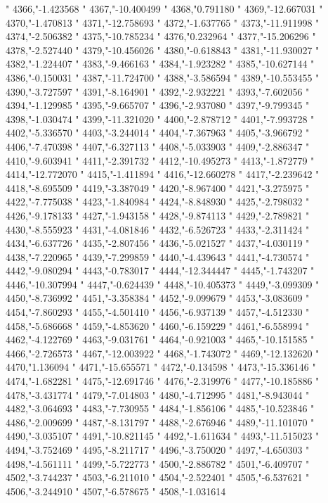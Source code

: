 "
4366,"-1.423568
"
4367,"-10.400499
"
4368,"0.791180
"
4369,"-12.667031
"
4370,"-1.470813
"
4371,"-12.758693
"
4372,"-1.637765
"
4373,"-11.911998
"
4374,"-2.506382
"
4375,"-10.785234
"
4376,"0.232964
"
4377,"-15.206296
"
4378,"-2.527440
"
4379,"-10.456026
"
4380,"-0.618843
"
4381,"-11.930027
"
4382,"-1.224407
"
4383,"-9.466163
"
4384,"-1.923282
"
4385,"-10.627144
"
4386,"-0.150031
"
4387,"-11.724700
"
4388,"-3.586594
"
4389,"-10.553455
"
4390,"-3.727597
"
4391,"-8.164901
"
4392,"-2.932221
"
4393,"-7.602056
"
4394,"-1.129985
"
4395,"-9.665707
"
4396,"-2.937080
"
4397,"-9.799345
"
4398,"-1.030474
"
4399,"-11.321020
"
4400,"-2.878712
"
4401,"-7.993728
"
4402,"-5.336570
"
4403,"-3.244014
"
4404,"-7.367963
"
4405,"-3.966792
"
4406,"-7.470398
"
4407,"-6.327113
"
4408,"-5.033903
"
4409,"-2.886347
"
4410,"-9.603941
"
4411,"-2.391732
"
4412,"-10.495273
"
4413,"-1.872779
"
4414,"-12.772070
"
4415,"-1.411894
"
4416,"-12.660278
"
4417,"-2.239642
"
4418,"-8.695509
"
4419,"-3.387049
"
4420,"-8.967400
"
4421,"-3.275975
"
4422,"-7.775038
"
4423,"-1.840984
"
4424,"-8.848930
"
4425,"-2.798032
"
4426,"-9.178133
"
4427,"-1.943158
"
4428,"-9.874113
"
4429,"-2.789821
"
4430,"-8.555923
"
4431,"-4.081846
"
4432,"-6.526723
"
4433,"-2.311424
"
4434,"-6.637726
"
4435,"-2.807456
"
4436,"-5.021527
"
4437,"-4.030119
"
4438,"-7.220965
"
4439,"-7.299859
"
4440,"-4.439643
"
4441,"-4.730574
"
4442,"-9.080294
"
4443,"-0.783017
"
4444,"-12.344447
"
4445,"-1.743207
"
4446,"-10.307994
"
4447,"-0.624439
"
4448,"-10.405373
"
4449,"-3.099309
"
4450,"-8.736992
"
4451,"-3.358384
"
4452,"-9.099679
"
4453,"-3.083609
"
4454,"-7.860293
"
4455,"-4.501410
"
4456,"-6.937139
"
4457,"-4.512330
"
4458,"-5.686668
"
4459,"-4.853620
"
4460,"-6.159229
"
4461,"-6.558994
"
4462,"-4.122769
"
4463,"-9.031761
"
4464,"-0.921003
"
4465,"-10.151585
"
4466,"-2.726573
"
4467,"-12.003922
"
4468,"-1.743072
"
4469,"-12.132620
"
4470,"1.136094
"
4471,"-15.655571
"
4472,"-0.134598
"
4473,"-15.336146
"
4474,"-1.682281
"
4475,"-12.691746
"
4476,"-2.319976
"
4477,"-10.185886
"
4478,"-3.431774
"
4479,"-7.014803
"
4480,"-4.712995
"
4481,"-8.943044
"
4482,"-3.064693
"
4483,"-7.730955
"
4484,"-1.856106
"
4485,"-10.523846
"
4486,"-2.009699
"
4487,"-8.131797
"
4488,"-2.676946
"
4489,"-11.101070
"
4490,"-3.035107
"
4491,"-10.821145
"
4492,"-1.611634
"
4493,"-11.515023
"
4494,"-3.752469
"
4495,"-8.211717
"
4496,"-3.750020
"
4497,"-4.650303
"
4498,"-4.561111
"
4499,"-5.722773
"
4500,"-2.886782
"
4501,"-6.409707
"
4502,"-3.744237
"
4503,"-6.211010
"
4504,"-2.522401
"
4505,"-6.537621
"
4506,"-3.244910
"
4507,"-6.578675
"
4508,"-1.031614
